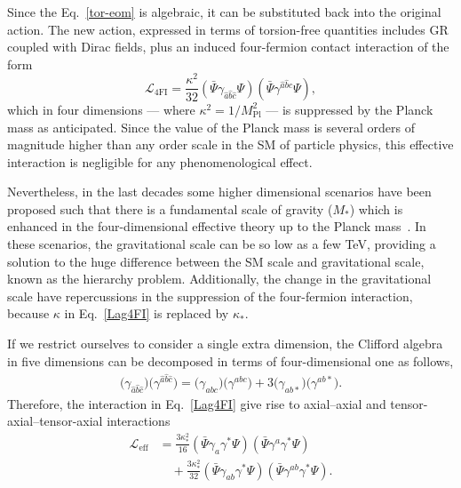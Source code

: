 \documentclass{ws-mpla}
\newcommand{\ga}{\gamma}
\newcommand{\Lag}{\mathscr{L}}
\renewcommand{\(}{\left(}
\renewcommand{\)}{\right)}
\renewcommand{\[}{\left[}
\renewcommand{\]}{\right]}
\begin{document}
Since the  Eq.~\eqref{tor-eom} is algebraic, it can be substituted back into the original action. The new action, expressed in terms of torsion-free quantities includes GR coupled with Dirac fields, plus an  induced four-fermion contact interaction of the form
\begin{equation}
  \Lag_{\text{4FI}} = \frac{\kappa^2}{32} \( \bar{\Psi}\ga_{\hat{a} \hat{b} \hat{c}}\Psi \)  \( \bar{\Psi}\ga^{\hat{a} \hat{b} \hat{c}}\Psi \),
  \label{Lag4FI}
\end{equation}
which in four dimensions --- where $\kappa^2 = {1}/{M_{\text{Pl}}^2}$ --- is suppressed by the Planck mass as anticipated. Since the value of the Planck mass is several orders of magnitude higher than any order scale in the SM of particle physics, this effective interaction is negligible for any phenomenological effect.

Nevertheless, in the last decades some higher dimensional scenarios have been proposed such that there is a fundamental scale of gravity ($M_*$) which is enhanced in the four-dimensional effective theory up to the Planck mass~\cite{ADD1,AADD,ADD2,RS1,RS2}. In these scenarios, the gravitational scale can be so low as a few \si{\TeV}, providing a solution to the huge difference between the SM scale and gravitational scale, known as the hierarchy problem. Additionally, the change in the gravitational scale have repercussions in the suppression of the four-fermion interaction, because $\kappa$ in Eq.~\eqref{Lag4FI} is replaced by $\kappa_*$.

If we restrict ourselves to consider a single extra dimension, the Clifford algebra in five dimensions can be decomposed in terms of four-dimensional one as follows,
\begin{align}
  \big(\ga_{\hat{a} \hat{b} \hat{c}}\big) \big(\ga^{\hat{a} \hat{b} \hat{c}}\big) = \big(\ga_{a b c}\big)\big(\ga^{a b c}\big) + 3 \big(\ga_{a b *}\big)\big(\ga^{a b *}\big).
  \label{Cliff-decomp}
\end{align}
Therefore, the interaction in Eq.~\eqref{Lag4FI} give rise to axial--axial and tensor-axial--tensor-axial interactions~\cite{Castillo-Felisola:2013jva}
\begin{equation}
  \begin{split}
    \Lag_{\text{eff}}
    & = \frac{3 \kappa_*^2}{16} \( \bar{\Psi} \ga_{a}\ga^* \Psi \) \( \bar{\Psi} \ga^{a}\ga^* \Psi \) \\
    & \quad + \frac{3 \kappa_*^2}{32} \( \bar{\Psi} \ga_{a b}\ga^* \Psi \) \( \bar{\Psi} \ga^{a b}\ga^* \Psi \).
  \end{split}
  \label{Eff4fi}
\end{equation}
\end{document}
